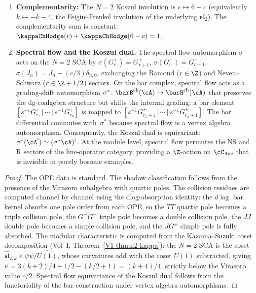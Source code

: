 \begin{proposition}[$N{=}2$ SCA shadow data; \ClaimStatusProvedHere]
\begin{enumerate}[label=\textup{(\roman*)},nosep]
 \textbf{Caution} \textup{(}N{=}2 exception\textup{)}: the $N{=}2$
 modular characteristic is NOT $c/2$. The $N{=}2$ SCA is a coset,
 and the coset subtraction reduces $\kappa$ below the Virasoro
 value $c/2$.

\item \textbf{Complementarity:}
 The $N{=}2$ Koszul involution is $c \mapsto 6 - c$
 \textup{(}equivalently $k \mapsto -k - 4$, the
 Feigin--Frenkel involution of the underlying
 $\mathfrak{sl}_2$\textup{)}. The complementarity sum is constant:
 $\kappaChHodge(c) + \kappaChHodge(6-c) = 1$.

\item \textbf{Spectral flow and the Koszul dual.}
 The spectral flow automorphism $\sigma$ acts on the $N{=}2$ SCA
 by $\sigma(G^+_r) = G^+_{r+1}$, $\sigma(G^-_r) = G^-_{r-1}$,
 $\sigma(J_n) = J_n + (c/3)\delta_{n,0}$, exchanging the Ramond
 \textup{(}$r \in \Z$\textup{)} and Neveu--Schwarz
 \textup{(}$r \in \Z + 1/2$\textup{)} sectors. On the bar complex,
 spectral flow acts as a grading-shift automorphism
 $\sigma^* \colon \barB^{\mathrm{ch}}(\cA) \to \barB^{\mathrm{ch}}(\cA)$
 that preserves the dg-coalgebra structure but shifts the
 internal grading: a bar element
 $[s^{-1}G^+_{r_1} \,|\, \cdots \,|\, s^{-1}G^+_{r_n}]$
 is mapped to
 $[s^{-1}G^+_{r_1+1} \,|\, \cdots \,|\, s^{-1}G^+_{r_n+1}]$.
 The bar differential commutes with~$\sigma^*$ because spectral
 flow is a vertex algebra automorphism. Consequently, the Koszul
 dual is equivariant: $\sigma^*(\cA^!) \simeq (\sigma^*\cA)^!$.
 At the module level, spectral flow permutes the NS and R
 sectors of the line-operator category, providing a
 $\Z$-action on $\cC_{\mathrm{line}}$ that is invisible
 in purely bosonic examples.
\end{enumerate}
\end{proposition}

\begin{proof}
The OPE data is standard. The shadow classification follows from
the presence of the Virasoro subalgebra with quartic poles. The
collision residues are computed channel by channel using the dlog-absorption identity: the
$d\log$ bar kernel absorbs one pole order from each OPE, so the
$TT$ quartic pole becomes a triple collision pole, the $G^+G^-$
triple pole becomes a double collision pole, the $JJ$ double pole
becomes a simple collision pole, and the $JG^\pm$ simple pole is
fully absorbed. The modular characteristic is computed from the
Kazama--Suzuki coset decomposition
(Vol~I, Theorem~\ref{V1-thm:n2-kappa}): the $N{=}2$ SCA is the coset
$\widehat{\mathfrak{sl}}_{2,k} \times \psi\bar\psi / \widehat{U(1)}$,
whose curvatures add with the coset $U(1)$ subtracted, giving
$\kappa = 3(k{+}2)/4 + 1/2 - (k/2{+}1) = (k{+}4)/4$, strictly below
the Virasoro value $c/2$. Spectral flow equivariance of the Koszul
dual follows from the functoriality of the bar construction under
vertex algebra automorphisms.
\end{proof}

